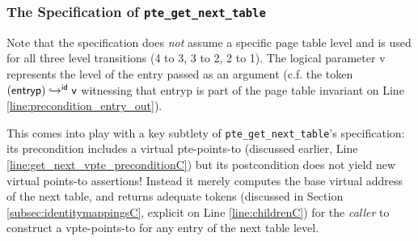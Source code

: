 \subsubsection{The Specification of \lstinline|pte_get_next_table|}
Note that the specification does \emph{not} assume a specific page table level and is used
for all three level transitions (4 to 3, 3 to 2, 2 to 1).
The logical parameter \textsf{v} represents the level
of the entry passed as an argument (c.f. the token $\ghostmaptoken{\textsf{id}}{(\mathsf{entryp})}{\textsf{v}}$ witnessing
that \textsf{entryp} is part of the page table invariant on Line \ref{line:precondition_entry_out}).

This comes into play with a key subtlety of \lstinline|pte_get_next_table|'s
specification: its precondition
includes a virtual {pte-points-to} (discussed earlier, Line \ref{line:get_next_vpte_preconditionC})
but its postcondition does not yield new virtual points-to assertions!
Instead it merely computes the base virtual address of the next table, and returns adequate tokens
(discussed in Section \ref{subsec:identitymappingsC}, explicit on Line \ref{line:childrenC})
for the \emph{caller} to construct a vpte-points-to for any entry of the next table level.

